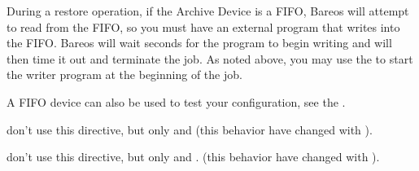 {\begin{description}

During a restore operation, if the Archive Device is a FIFO, Bareos  will
attempt to read from the FIFO, so you must have an external program  that
writes into the FIFO. 
Bareos will wait  seconds  for the
program to begin writing and will then time it out and  terminate the job. As
noted above, you may use the  to start the writer program
at the beginning of the job.

A FIFO device can also be used to test your configuration, see the .

    \item[GlusterFS Storage] \label{GlusterArchiveType}
	don't use this directive,
	but only  and 
	(this behavior have changed with ).
    
   \item[Ceph Object Store] \label{CephArchiveType}
	don't use this directive,
	but only  and .
	(this behavior have changed with ).
\end{description}
}

